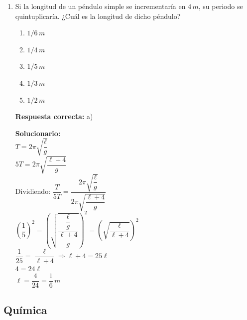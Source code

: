 \begin{enumerate}
	$P = \dfrac{Q}{t} \Rightarrow t = \dfrac{Q}{P} = \dfrac{336 \, kJ}{420 \, W}$ \\
	$t = \dfrac{8 \times 10^3 \times 4,2 \times 10}{420} = 800 \, s$

	\vspace{6mm}


\item Si la longitud de un péndulo simple se incrementaría en $4 \, m$, su periodo se quintuplicaría. ¿Cuál es la longitud de dicho péndulo?

\begin{enumerate}[label=\alph*)]
	\item $1/6 \, m$
	\item $1/4 \, m$
	\item $1/5 \, m$
	\item $1/3 \, m$
	\item $1/2 \, m$
\end{enumerate}

\textbf{Respuesta correcta:} a)

\vspace{2mm}
\textbf{Solucionario:}\\
$T = 2\pi \sqrt{\dfrac{\ell}{g}}$ \\
$5T = 2\pi \sqrt{\dfrac{\ell + 4}{g}}$ \\

Dividiendo:
$\dfrac{T}{5T} = \dfrac{2\pi \sqrt{\dfrac{\ell}{g}}}{2\pi \sqrt{\dfrac{\ell + 4}{g}}}$ \\

$\left( \dfrac{1}{5} \right)^2 = \left( \sqrt{\dfrac{\dfrac{\ell}{g}}{\dfrac{\ell + 4}{g}}} \right)^2 = \left( \sqrt{\dfrac{\ell}{\ell + 4}} \right)^2$ \\

$\dfrac{1}{25} = \dfrac{\ell}{\ell + 4} \Rightarrow \ell + 4 = 25\ell$ \\

$4 = 24\ell$ \\

$\ell = \dfrac{4}{24} = \dfrac{1}{6} \, m$

\vspace{6mm}
\end{enumerate}



\subsection*{Química}

